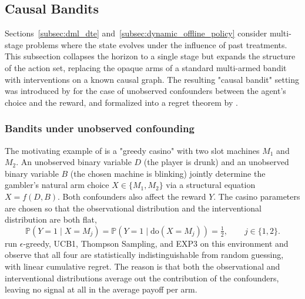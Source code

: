 \subsection{Causal Bandits}
\label{subsec:causal_bandits}

Sections~\ref{subsec:dml_dte} and~\ref{subsec:dynamic_offline_policy} consider multi-stage problems where the state evolves under the influence of past treatments. This subsection collapses the horizon to a single stage but expands the structure of the action set, replacing the opaque arms of a standard multi-armed bandit with interventions on a known causal graph. The resulting "causal bandit" setting was introduced by \citet{bareinboim2015mabuc} for the case of unobserved confounders between the agent's choice and the reward, and formalized into a regret theorem by \citet{lattimore2016causal}.

\subsubsection*{Bandits under unobserved confounding}

The motivating example of \citet{bareinboim2015mabuc} is a "greedy casino" with two slot machines $M_1$ and $M_2$. An unobserved binary variable $D$ (the player is drunk) and an unobserved binary variable $B$ (the chosen machine is blinking) jointly determine the gambler's natural arm choice $X \in \{M_1, M_2\}$ via a structural equation $X = f(D, B)$. Both confounders also affect the reward $Y$. The casino parameters are chosen so that the observational distribution and the interventional distribution are both flat,
\begin{equation}
\mathbb{P}(Y = 1 \mid X = M_j) = \mathbb{P}(Y = 1 \mid \mathrm{do}(X = M_j)) = \tfrac{1}{2}, \qquad j \in \{1, 2\}.
\label{eq:mabuc_degenerate}
\end{equation}
\citet{bareinboim2015mabuc} run $\epsilon$-greedy, UCB1, Thompson Sampling, and EXP3 on this environment and observe that all four are statistically indistinguishable from random guessing, with linear cumulative regret. The reason is that both the observational and interventional distributions average out the contribution of the confounders, leaving no signal at all in the average payoff per arm.


